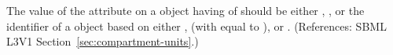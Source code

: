 The value of the attribute  on a \Compartment object having
 of  should be either ,
, or the identifier of a \UnitDefinition object based on either
,  (with  equal to ), or
.  (References: SBML L3V1
Section~\ref{sec:compartment-units}.)
